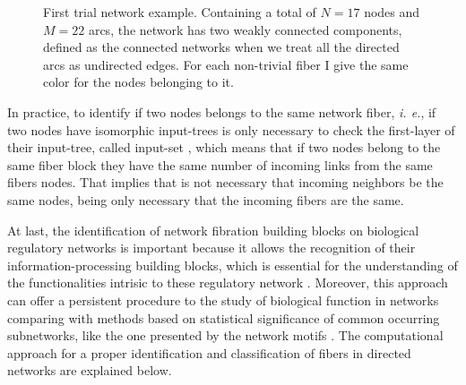 \documentclass[12pt]{diazessay} %
\begin{document}
\begin{figure}[h]
	\caption{First trial network example. Containing a total of $N = 17$ nodes and $M = 22$ arcs, the network has two weakly connected components, defined as the connected networks when we treat all the directed arcs as undirected edges. For each non-trivial fiber I give the same color for the nodes belonging to it.}
	\label{fig:inputex}
\end{figure}

In practice, to identify if two nodes belongs to the same network fiber, \textit{i. e.}, if two nodes have isomorphic input-trees is only necessary to check the first-layer of their input-tree, called input-set \cite{norris1995}, which means that if two nodes belong to the same fiber block they have the same number of incoming links from the same fibers nodes. That implies that is not necessary that incoming neighbors be the same nodes, being only necessary that the incoming fibers are the same. 

At last, the identification of network fibration building blocks on biological regulatory networks is important because it allows the recognition of their information-processing building blocks, which is essential for the understanding of the functionalities intrisic to these regulatory network \cite{transistor2019}. Moreover, this approach can offer a persistent procedure to the study of biological function in networks comparing with methods based on statistical significance of common occurring subnetworks, like the one presented by the network motifs \cite{motifs2002}. The computational approach for a proper identification and classification of fibers in directed networks are explained below.
\end{document}
